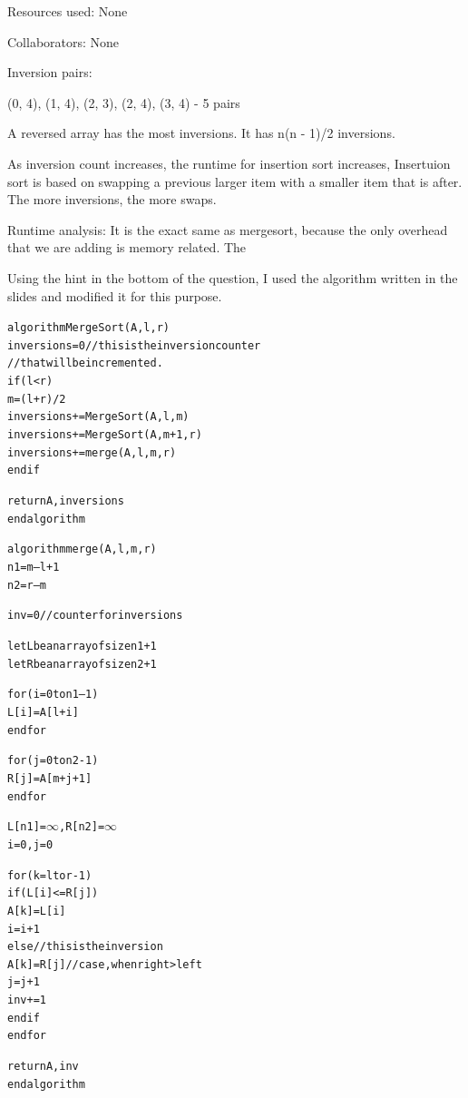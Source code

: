 \documentclass[11pt,largemargins]{homework}
\begin{document}
\newpage
\question
Resources used: None

Collaborators: None

\begin{alphaparts}
  \questionpart

  Inversion pairs:

  (0, 4), (1, 4), (2, 3), (2, 4), (3, 4) - 5 pairs

  \questionpart

  A reversed array has the most inversions. It has n(n - 1)/2 inversions.

  \questionpart

  As inversion count increases, the runtime for insertion sort increases, Insertuion sort is based on swapping a previous 
  larger item with a smaller item that is after. The more inversions, the more swaps.

  \questionpart
  Runtime analysis: It is the exact same as mergesort, because the only overhead that we are adding is memory related. The

  Using the hint in the bottom of the question, I used the algorithm written in the slides and modified it for this purpose.

  \begin{alltt}
algorithm MergeSort(A, l, r)
  inversions = 0                      // this is the inversion counter 
                                      // that will be incremented.
  if (l < r)
    m = (l + r) / 2
    inversions += MergeSort(A, l, m)
    inversions += MergeSort(A, m + 1, r)
    inversions += merge(A, l, m, r)
  end if

  return A, inversions
end algorithm


algorithm merge(A, l, m, r)
  n1 = m – l + 1
  n2 = r – m
  
  inv = 0 // counter for inversions
  
  let L be an array of size n1 + 1
  let R be an array of size n2 + 1

    for (i = 0 to n1 – 1)
      L[i] = A[l + i]
    end for

    for (j = 0 to n2 - 1)
      R[j] = A[m + j + 1]
    end for

    L[n1] = \(\infty\), R[n2] = \(\infty\)
    i = 0, j = 0

    for (k = l to r - 1)
      if (L[i] <= R[j])
        A[k] = L[i]
        i = i + 1
      else                  // this is the inversion
        A[k] = R[j]         // case, when right > left
        j = j + 1
        inv += 1
      end if
    end for

  return A, inv
end algorithm
\end{alltt}

\end{alphaparts}
\end{document}
